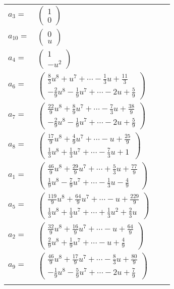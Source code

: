 \documentclass[1p]{elsarticle_modified}
\theoremstyle{definition}
\begin{document}
\begin{tabular}{m{7pt} m{180pt} m{7pt} m{180pt} }
\flushright $a_{3}=$&$\begin{pmatrix}1\\0\end{pmatrix}$ \\
\flushright $a_{10}=$&$\begin{pmatrix}0\\u\end{pmatrix}$ \\
\flushright $a_{4}=$&$\begin{pmatrix}1\\- u^2\end{pmatrix}$ \\
\flushright $a_{6}=$&$\begin{pmatrix}\frac{8}{3} u^8+u^7+\cdots-\frac{1}{3} u+\frac{11}{3}\\-\frac{2}{9} u^8-\frac{1}{9} u^7+\cdots-2 u+\frac{5}{9}\end{pmatrix}$ \\
\flushright $a_{7}=$&$\begin{pmatrix}\frac{22}{9} u^8+\frac{8}{9} u^7+\cdots-\frac{7}{3} u+\frac{38}{9}\\-\frac{2}{9} u^8-\frac{1}{9} u^7+\cdots-2 u+\frac{5}{9}\end{pmatrix}$ \\
\flushright $a_{8}=$&$\begin{pmatrix}\frac{17}{9} u^8+\frac{4}{9} u^7+\cdots- u+\frac{25}{9}\\\frac{1}{3} u^8+\frac{1}{3} u^7+\cdots-\frac{7}{3} u+1\end{pmatrix}$ \\
\flushright $a_{1}=$&$\begin{pmatrix}\frac{46}{9} u^8+\frac{29}{9} u^7+\cdots+\frac{5}{3} u+\frac{77}{9}\\\frac{1}{9} u^8-\frac{7}{9} u^7+\cdots-\frac{1}{3} u-\frac{4}{9}\end{pmatrix}$ \\
\flushright $a_{5}=$&$\begin{pmatrix}\frac{119}{9} u^8+\frac{64}{9} u^7+\cdots- u+\frac{229}{9}\\\frac{1}{3} u^8+\frac{1}{3} u^7+\cdots+\frac{1}{3} u^2+\frac{2}{3} u\end{pmatrix}$ \\
\flushright $a_{2}=$&$\begin{pmatrix}\frac{32}{9} u^8+\frac{16}{9} u^7+\cdots- u+\frac{64}{9}\\\frac{2}{9} u^8+\frac{1}{9} u^7+\cdots- u+\frac{4}{9}\end{pmatrix}$ \\
\flushright $a_{9}=$&$\begin{pmatrix}\frac{46}{9} u^8+\frac{17}{9} u^7+\cdots-\frac{8}{3} u+\frac{80}{9}\\-\frac{1}{9} u^8-\frac{5}{9} u^7+\cdots-2 u+\frac{7}{9}\end{pmatrix}$\\&\end{tabular}
\end{document}
